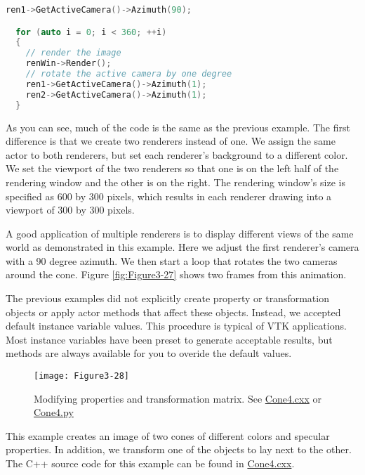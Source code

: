 \begin{description}[leftmargin=0cm,labelindent=0cm]
\begin{lstlisting}[language=C++, caption={Cone3.cxx}]
  ren1->GetActiveCamera()->Azimuth(90);

  for (auto i = 0; i < 360; ++i)
  {
    // render the image
    renWin->Render();
    // rotate the active camera by one degree
    ren1->GetActiveCamera()->Azimuth(1);
    ren2->GetActiveCamera()->Azimuth(1);
  }
\end{lstlisting}

As you can see, much of the code is the same as the previous example. The first difference is that we create two renderers instead of one. We assign the same actor to both renderers, but set each renderer's background to a different color. We set the viewport of the two renderers so that one is on the left half of the rendering window and the other is on the right. The rendering window's size is specified as 600 by 300 pixels, which results in each renderer drawing into a viewport of 300 by 300 pixels.

A good application of multiple renderers is to display different views of the same world as demonstrated in this example. Here we adjust the first renderer's camera with a 90 degree azimuth. We then start a loop that rotates the two cameras around the cone. Figure \ref{fig:Figure3-27} shows two frames from this animation.

\item[Properties and Transformations.]

The previous examples did not explicitly create property or transformation objects or apply actor methods that affect these objects. Instead, we accepted default instance variable values. This procedure is typical of VTK applications. Most instance variables have been preset to generate acceptable results, but methods are always available for you to overide the default values.

\begin{figure}[!htb]
  \centering
  \texttt{[image: Figure3-28]}\\
  \caption{Modifying properties and transformation matrix. See  \href{https://lorensen.github.io/VTKExamples/site/Cxx/Rendering/Cone4/}{Cone4.cxx} or \href{https://lorensen.github.io/VTKExamples/site/Python/Rendering/Cone4/}{Cone4.py}}\label{fig:Figure3-28}
\end{figure}

This example creates an image of two cones of different colors and specular properties. In addition, we transform one of the objects to lay next to the other. The C++ source code for this example can be found in \href{https://lorensen.github.io/VTKExamples/site/Cxx/Rendering/Cone4/}{Cone4.cxx}.


\end{description}
